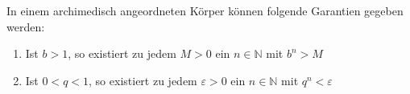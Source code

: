 In einem archimedisch angeordneten Körper können folgende Garantien gegeben werden:
\begin{enumerate}
    \item Ist $b > 1$, so existiert zu jedem $M > 0$ ein $n \in \mathbb{N}$ mit $b^n > M$
    \item Ist $0 < q < 1$, so existiert zu jedem $\varepsilon > 0$ ein $n \in \mathbb{N}$ mit $q^n < \varepsilon$
\end{enumerate}